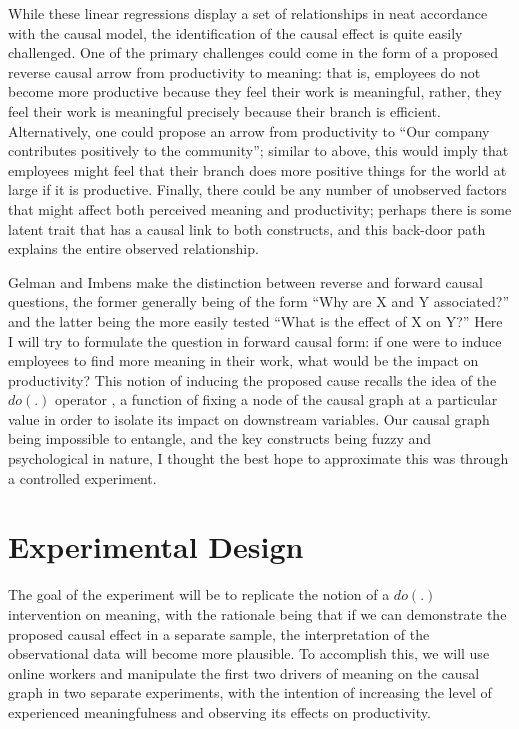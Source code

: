 \documentclass[12pt]{article}
\begin{document}
While these linear regressions display a set of relationships in neat accordance with the causal model, the identification of the causal effect is quite easily challenged. One of the primary challenges could come in the form of a proposed reverse causal arrow from productivity to meaning:  that is, employees do not become more productive because they feel their work is meaningful, rather, they feel their work is meaningful precisely because their branch is efficient. Alternatively, one could propose an arrow from productivity to ``Our company contributes positively to the community''; similar to above, this would imply that employees might feel that their branch does more positive things for the world at large if it is productive. Finally, there could be any number of unobserved factors that might affect both perceived meaning and productivity; perhaps there is some latent trait that has a causal link to both constructs, and this back-door path explains the entire observed relationship.

Gelman and Imbens \citeyear{Gelman:13} make the distinction between reverse and forward causal questions, the former generally being of the form ``Why are X and Y associated?'' and the latter being the more easily tested ``What is the effect of X on Y?'' Here I will try to formulate the question in forward causal form: if one were to induce employees to find more meaning in their work, what would be the impact on productivity? This notion of inducing the proposed cause recalls the idea of the $do(.)$ operator \citep{Pearl:09}, a function of fixing a node of the causal graph at a particular value in order to isolate its impact on downstream variables. Our causal graph being impossible to entangle, and the key constructs being fuzzy and psychological in nature, I thought the best hope to approximate this was through a controlled experiment. 

\section{Experimental Design}

The goal of the experiment will be to replicate the notion of a $do(.)$ intervention on meaning, with the rationale being that if we can demonstrate the proposed causal effect in a separate sample, the interpretation of the observational data will become more plausible. To accomplish this, we will use online workers and manipulate the first two drivers of meaning on the causal graph in two separate experiments, with the intention of increasing the level of experienced meaningfulness and observing its effects on productivity.
\end{document}
